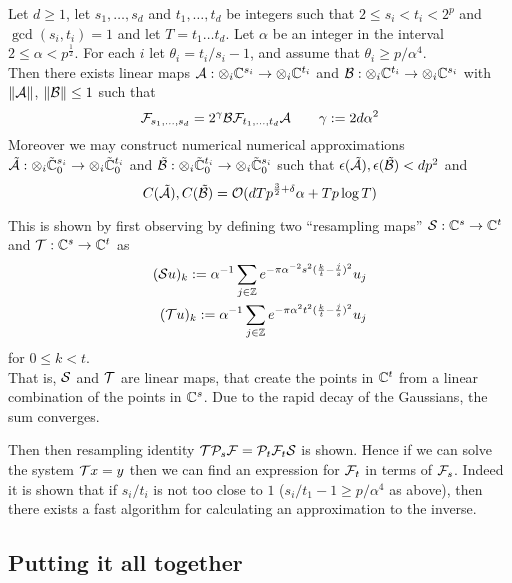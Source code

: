 \begin{theorem}
    Let $d \geq 1$, let $s_1, \ldots, s_d$ and $t_1, \ldots, t_d$ be integers such that $2 \leq s_i < t_i < 2^p$ and $\gcd(s_i, t_i) = 1$ and let $T = t_1\ldots t_d$. Let $\alpha$ be an integer in the interval $2 \leq \alpha < p^{\frac{1}{2}}$. For each $i$ let $\theta_i = t_i / s_i - 1$, and assume that $\theta_i \geq p/\alpha^4$.\\
    Then there exists linear maps $\mathcal A: \otimes_i {\mathbb C}^{s_i} \to \otimes_i {\mathbb C}^{t_i}$ and $\mathcal B: \otimes_i {\mathbb C}^{t_i} \to \otimes_i {\mathbb C}^{s_i}$ with $\|\mathcal A\|$, $\|\mathcal B\| \leq 1$ such that
    \[
        \mathcal F_{s_1, \ldots, s_d} = 2^\gamma \mathcal B \mathcal F_{t_1, \ldots, t_d} \mathcal A \qquad \gamma := 2d\alpha^2
    \]
    Moreover we may construct numerical numerical approximations $\tilde{\mathcal A}: \otimes_i \tilde{{\mathbb C}}^{s_i}_0 \to \otimes_i \tilde{{\mathbb C}}^{t_i}_0$ and $\tilde{\mathcal B}: \otimes_i \tilde{{\mathbb C}}^{t_i}_0 \to \otimes_i \tilde{{\mathbb C}}^{s_i}_0$  such that $\epsilon(\tilde{\mathcal A}), \epsilon(\tilde{\mathcal B}) < dp^2$ and
    \[
        C(\tilde{\mathcal A}), C(\tilde{\mathcal B}) = \mathcal O(dTp^{{\frac{3}{2}} + \delta}\alpha + Tp\log T)
    \]
\end{theorem}

This is shown by first observing by defining two ``resampling maps'' $\mathcal S: {\mathbb C}^s \to {\mathbb C}^t$ and $\mathcal T: {\mathbb C}^s \to {\mathbb C}^t$ as
\begin{align*}
    (\mathcal Su)_k := \alpha^{-1} \sum_{j \in {\mathbb Z}} e^{-\pi \alpha^{-2}s^2 (\frac{k}{t} - \frac{j}{s})^2}u_j\\
    (\mathcal Tu)_k := \alpha^{-1} \sum_{j \in {\mathbb Z}} e^{-\pi \alpha^2 t^2 (\frac{k}{t} - \frac{j}{s})^2}u_j\\
\end{align*}
for $0 \leq k < t$.\\
That is, $\mathcal S$ and $\mathcal T$ are linear maps, that create the points in ${\mathbb C}^t$ from a linear combination of the points in ${\mathbb C}^s$. Due to the rapid decay of the Gaussians, the sum converges.

Then then resampling identity $\mathcal T\mathcal P_s\mathcal F = \mathcal P_t\mathcal F_t\mathcal S$ is shown. Hence if we can solve the system $\mathcal Tx = y$ then we can find an expression for $\mathcal F_t$ in terms of $\mathcal F_s$. Indeed it is shown that if $s_i / t_i$ is not too close to $1$ ($s_i / t_1 - 1 \geq p/\alpha^4$ as above), then there exists a fast algorithm for calculating an approximation to the inverse.

\subsection{Putting it all together}%
\label{sub:Putting it all together}

